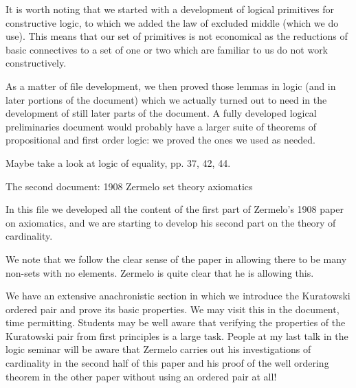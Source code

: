 \documentclass{slides}
\begin{document}
\begin{slide}

It is worth noting that we started with a development of logical primitives for constructive logic, to which we added the law of excluded middle (which we do use).  This means
that our set of primitives is not economical as the reductions of basic connectives to a set of one or two which are familiar to us do not work constructively.

As a matter of file development, we then proved those lemmas in logic (and in later portions of the document) which we actually turned out to need in the development of still later parts of the document.  A fully developed logical preliminaries document would probably have a larger suite of theorems of propositional and first order logic:  we proved the ones we used as needed.

Maybe take a look at logic of equality, pp. 37, 42, 44.

\end{slide}

\begin{slide}

{\Large The second document:  1908 Zermelo set theory axiomatics}

In this file we developed all the content of the first part of Zermelo's 1908 paper on axiomatics, and we are starting to develop his second part on the theory of cardinality.

We note that we follow the clear sense of the paper in allowing there to be many non-sets with no elements.  Zermelo is quite clear that he is allowing this.

\end{slide}

\begin{slide}

We have an extensive anachronistic section in which we introduce the Kuratowski ordered pair and prove its basic properties.  We may visit this in the document, time permitting.
Students may be well aware that verifying the properties of the Kuratowski pair from first principles is a large task.  People at my last talk in the logic seminar will be aware that Zermelo carries out his investigations of cardinality in the second half of this paper and his proof of the well ordering theorem in the other paper without using an ordered pair at all!

\end{slide}
\end{document}
